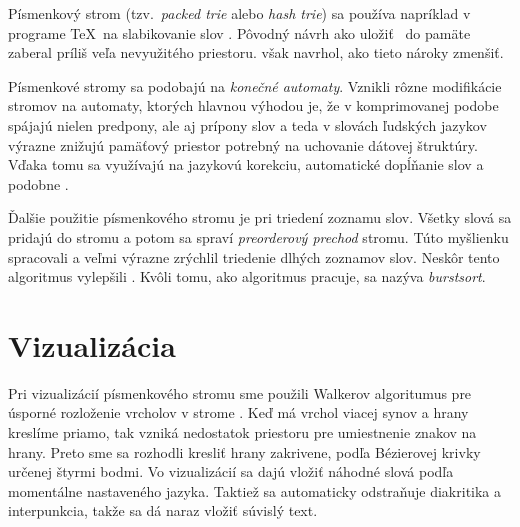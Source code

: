 Písmenkový strom (tzv.\ \emph{packed trie} alebo \emph{hash trie}) sa používa
napríklad v programe \TeX\ na slabikovanie slov \citep{liang}.
Pôvodný návrh \citep{fredkin} ako uložiť \trie\ do pamäte zaberal
príliš veľa nevyužitého priestoru. \citet{liang} však navrhol, ako
tieto nároky zmenšiť.

Písmenkové stromy sa podobajú na \emph{konečné automaty}. 
Vznikli rôzne modifikácie stromov na automaty, ktorých hlavnou výhodou je, 
že v komprimovanej podobe spájajú nielen predpony, ale aj prípony slov 
a teda v slovách ľudských jazykov výrazne znižujú pamäťový priestor potrebný 
na uchovanie dátovej štruktúry. Vďaka tomu sa využívajú na jazykovú korekciu, 
automatické dopĺňanie slov a podobne \citep{scrabble,ca}. 

Ďalšie použitie písmenkového stromu je pri triedení zoznamu slov. 
Všetky slová sa pridajú do stromu a potom sa spraví \emph{preorderový prechod} 
stromu. Túto myšlienku spracovali \citet{burstsort1} a veľmi výrazne zrýchlil 
triedenie dlhých zoznamov slov. Neskôr tento algoritmus vylepšili 
\citet{burstsort2}. Kvôli tomu, ako algoritmus pracuje, 
sa nazýva \emph{burstsort}.


\section{Vizualizácia} Pri vizualizácií písmenkového stromu sme použili 
Walkerov algoritumus pre úsporné rozloženie vrcholov v strome
\citep{walker}. Keď má vrchol viacej synov a hrany kreslíme priamo, tak vzniká 
nedostatok priestoru pre umiestnenie znakov na hrany. Preto sme sa rozhodli 
kresliť hrany zakrivene, podľa Bézierovej krivky určenej štyrmi bodmi. 
Vo vizualizácií sa dajú vložiť náhodné slová podľa momentálne nastaveného 
jazyka. Taktiež sa automaticky odstraňuje diakritika a interpunkcia, takže 
sa dá naraz vložiť súvislý text.
